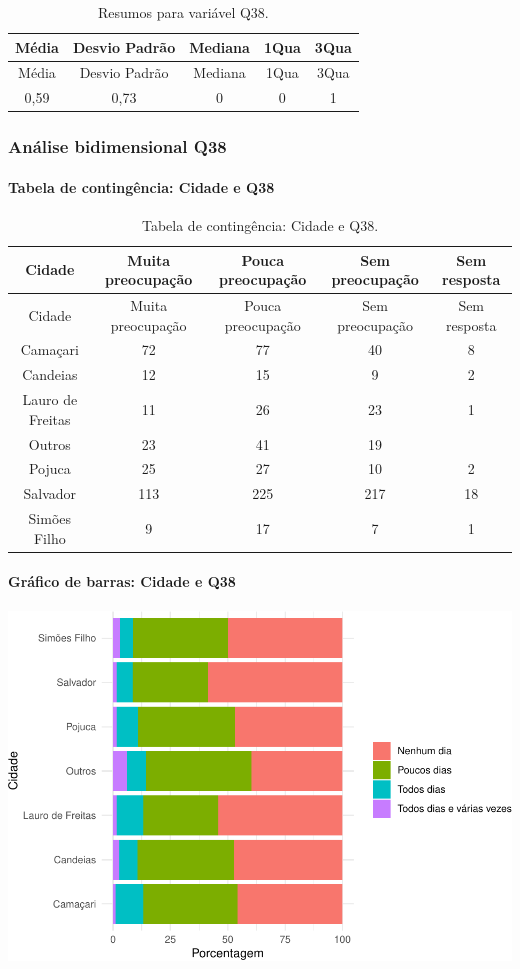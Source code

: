 \documentclass[]{article}
\let\oldparagraph\paragraph
\renewcommand{\paragraph}[1]{\oldparagraph{#1}\mbox{}}
\begin{document}
\begin{longtable}[]{@{}ccccc@{}}
\caption{\label{tab:unnamed-chunk-1427}Resumos para variável Q38.}\tabularnewline
\toprule
Média & Desvio Padrão & Mediana & 1Qua & 3Qua\tabularnewline
\midrule
\endfirsthead
\toprule
Média & Desvio Padrão & Mediana & 1Qua & 3Qua\tabularnewline
\midrule
\endhead
0,59 & 0,73 & 0 & 0 & 1\tabularnewline
\bottomrule
\end{longtable}

\cleardoublepage

\hypertarget{anuxe1lise-bidimensional-q38}{%
\subsubsection{Análise bidimensional Q38}\label{anuxe1lise-bidimensional-q38}}

\hypertarget{tabela-de-continguxeancia-cidade-e-q38}{%
\paragraph{Tabela de contingência: Cidade e Q38}\label{tabela-de-continguxeancia-cidade-e-q38}}

\begin{longtable}[]{@{}ccccc@{}}
\caption{\label{tab:unnamed-chunk-1428}Tabela de contingência: Cidade e Q38.}\tabularnewline
\toprule
Cidade & Muita preocupação & Pouca preocupação & Sem preocupação & Sem resposta\tabularnewline
\midrule
\endfirsthead
\toprule
Cidade & Muita preocupação & Pouca preocupação & Sem preocupação & Sem resposta\tabularnewline
\midrule
\endhead
Camaçari & 72 & 77 & 40 & 8\tabularnewline
Candeias & 12 & 15 & 9 & 2\tabularnewline
Lauro de Freitas & 11 & 26 & 23 & 1\tabularnewline
Outros & 23 & 41 & 19 &\tabularnewline
Pojuca & 25 & 27 & 10 & 2\tabularnewline
Salvador & 113 & 225 & 217 & 18\tabularnewline
Simões Filho & 9 & 17 & 7 & 1\tabularnewline
\bottomrule
\end{longtable}

\hypertarget{gruxe1fico-de-barras-cidade-e-q38}{%
\paragraph{Gráfico de barras: Cidade e Q38}\label{gruxe1fico-de-barras-cidade-e-q38}}

\begin{center}\includegraphics[width=0.75\linewidth]{relatorio_covid19_files/figure-latex/unnamed-chunk-1429-1} \end{center}
\end{document}
